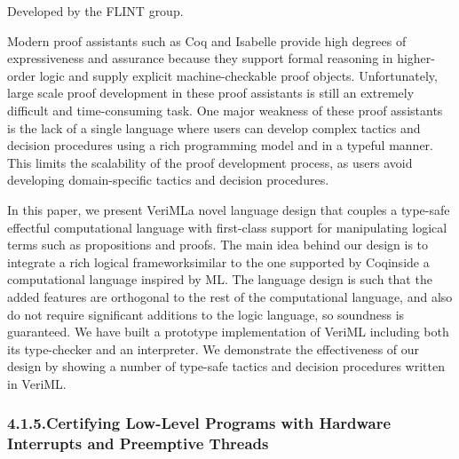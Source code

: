 \documentclass[12pt,twoside]{article}
\begin{document}
\noindent{}Developed by the FLINT group.%

Modern proof assistants such as Coq and Isabelle provide high degrees
of expressiveness and assurance because they support formal reasoning
in higher-order logic and supply explicit machine-checkable proof
objects. Unfortunately, large scale proof development in these proof
assistants is still an extremely difficult and time-consuming
task. One major weakness of these proof assistants is the lack of a
single language where users can develop complex tactics and decision
procedures using a rich programming model and in a typeful
manner. This limits the scalability of the proof development process,
as users avoid developing domain-specific tactics and decision
procedures.%

In this paper, we present VeriML\textemdash{}a novel language design that
couples a type-safe effectful computational language with first-class
support for manipulating logical terms such as propositions and
proofs. The main idea behind our design is to integrate a rich logical
framework\textemdash{}similar to the one supported by Coq\textemdash{}inside a
computational language inspired by ML. The language design is such
that the added features are orthogonal to the rest of the
computational language, and also do not require significant additions
to the logic language, so soundness is guaranteed. We have built a
prototype implementation of VeriML including both its type-checker and
an interpreter. We demonstrate the effectiveness of our design by
showing a number of type-safe tactics and decision procedures written
in VeriML.%

\subsubsection{4.1.5.\hspace*{0.5em}Certifying Low-Level Programs with Hardware Interrupts and Preemptive Threads}%
\end{document}
